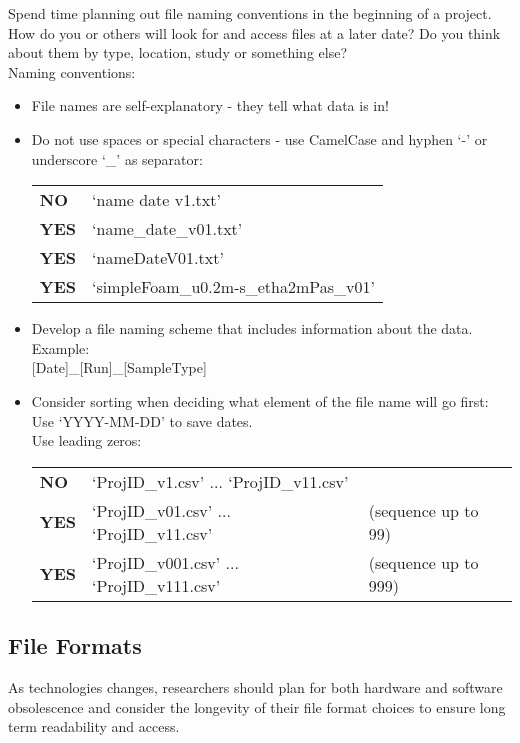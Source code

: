 Spend time planning out file naming conventions in the beginning of a project.
How do you or others will look for and access files at a later date? Do you
think about them by type, location, study or something else? \\[8pt]
Naming conventions:
\begin{itemize}
  \item File names are self-explanatory - they tell what data is in!
  \item Do not use spaces or special characters - use CamelCase and hyphen
        ‘-’ or underscore ‘\_’ as separator: \\
        \begin{tabular}{ll}
          \textbf{NO}  & ‘name date v1.txt’ \\
          \textbf{YES} & ‘name\_date\_v01.txt’ \\
          \textbf{YES} & ‘nameDateV01.txt’ \\
          \textbf{YES} & ‘simpleFoam\_u0.2m-s\_etha2mPas\_v01’ \\
        \end{tabular}
  \item Develop a file naming scheme that includes information about the data.
        Example: \\
        {[Date]}\_{[Run]}\_{[SampleType]}
  \item Consider sorting when deciding what element of the file name will
        go first: \\
        Use ‘YYYY-MM-DD’ to save dates. \\
        Use leading zeros: \\
        \begin{tabular}{lll}
          \textbf{NO}  & ‘ProjID\_v1.csv’  	...  	‘ProjID\_v11.csv’ & \\
          \textbf{YES} & ‘ProjID\_v01.csv’ 	... 	‘ProjID\_v11.csv’
             & (sequence up to 99) \\
          \textbf{YES} & ‘ProjID\_v001.csv’ 	...	‘ProjID\_v111.csv’
             & (sequence up to 999) \\
        \end{tabular}
\end{itemize}

\subsection{File Formats}
As technologies changes, researchers should plan for both hardware and software
obsolescence and consider the longevity of their file format choices to ensure
long term readability and access.


